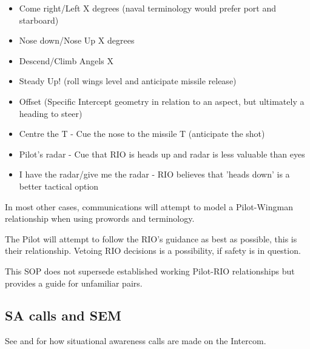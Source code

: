 \begin{itemize}
 \item Come right/Left X degrees (naval terminology would prefer port and
 starboard)

 \item Nose down/Nose Up X degrees

 \item Descend/Climb Angels X

 \item Steady Up! (roll wings level and anticipate missile release)

 \item Offset (Specific Intercept geometry in relation to an aspect, but
 ultimately a heading to steer)

 \item Centre the T - Cue the nose to the missile T (anticipate the shot)

 \item Pilot's radar - Cue that RIO is heads up and radar is less valuable
 than eyes

 \item I have the radar/give me the radar - RIO believes that 'heads down' is
 a better tactical option

\end{itemize}

In most other cases, communications will attempt to model a Pilot-Wingman
relationship when using prowords and terminology.

The Pilot will attempt to follow the RIO's guidance as best as possible, this
is their relationship. Vetoing RIO decisions is a possibility, if safety is in
question.

This SOP does not supersede established working Pilot-RIO relationships but
provides a guide for unfamiliar pairs.

\subsection{SA calls and SEM}

See  and  for how situational
awareness calls are made on the Intercom.

